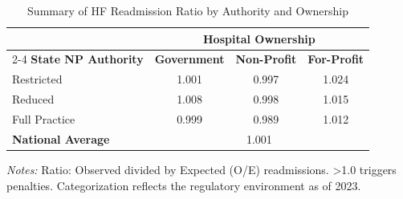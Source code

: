 \begin{table}[htbp]
    \centering
    \caption{Summary of HF Readmission Ratio by Authority and Ownership}
    \label{tab:rrp_excess_ratio_hf_own}
    \vspace{0.2cm}
    \begin{tabular}{lccc}
        \toprule
        & \multicolumn{3}{c}{\textbf{Hospital Ownership}} \\
        \cmidrule(lr){2-4}
        \textbf{State NP Authority} & \textbf{Government} & \textbf{Non-Profit} & \textbf{For-Profit} \\
        \midrule
        Restricted & 1.001 & 0.997 & 1.024 \\
        Reduced & 1.008 & 0.998 & 1.015 \\
        Full Practice & 0.999 & 0.989 & 1.012 \\
        \midrule
        \textbf{National Average} & \multicolumn{3}{c}{1.001} \\
        \bottomrule
    \end{tabular}
    \vspace{0.1cm}
    \begin{minipage}{0.85\textwidth}
        \footnotesize \textit{Notes:} Ratio: Observed divided by Expected (O/E) readmissions. >1.0 triggers penalties. Categorization reflects the regulatory environment as of 2023.
    \end{minipage}
\end{table}